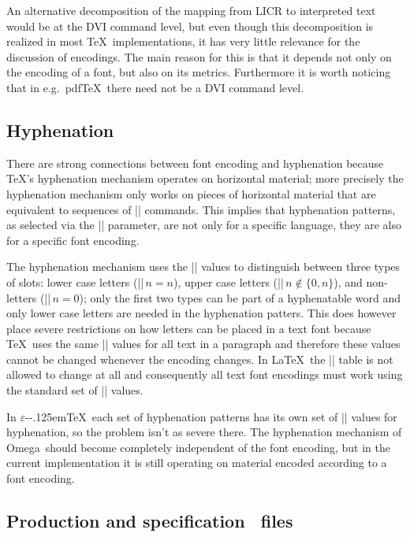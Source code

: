\documentclass[a4paper]{article}
\DeclareRobustCommand\ETX{\textsmaller{ETX}}
\newcommand{\TeXOmega}{Omega}
\DeclareRobustCommand\eTeX{\ensuremath{\varepsilon}-\kern-.125em\TeX}
\begin{document}
An alternative decomposition of the mapping from LICR to interpreted 
text would be at the DVI command level, but even though this 
decomposition is realized in most \TeX\ implementations, it has very 
little relevance for the discussion of encodings. The main reason for 
this is that it depends not only on the encoding of a font, but 
also on its metrics. Furthermore it is worth noticing that in e.g.\ 
pdf\TeX\ there need not be a DVI command level.


\subsection{Hyphenation}

There are strong connections between font encoding and hyphenation because 
\TeX's hyphenation mechanism operates on horizontal material; more 
precisely the hyphenation mechanism only works on pieces of horizontal 
material that are equivalent to sequences of |\char| commands. This 
implies that hyphenation patterns, as selected via the |\language| 
parameter, are not only for a specific language, they are also for a 
specific font encoding.

The hyphenation mechanism uses the |\lccode| values to distinguish 
between three types of slots: lower case letters (|\lccode|\(\,n = 
n\)), upper case letters (|\lccode|\(\,n \notin \{0,n\}\)), and 
non-letters (|\lccode|\(\,n = 0\)); only the first two types can be 
part of a hyphenatable word and only lower case letters are needed 
in the hyphenation patters. This does however place severe 
restrictions on how letters can be placed in a text font because 
\TeX\ uses the same |\lccode| values for all text in a paragraph and 
therefore these values cannot be changed whenever the encoding changes. 
In \LaTeX\ the |\lccode| table is not allowed to change at all and 
consequently all text font encodings must work using the standard set 
of |\lccode| values.

In \eTeX\ each set of hyphenation patterns has its own set of 
|\lccode| values for hyphenation, so the problem isn't as severe 
there. The hyphenation mechanism of \TeXOmega\ should become 
completely independent of the font encoding, but in the current 
implementation it is still operating on material encoded according to 
a font encoding.


\subsection{Production and specification \ETX\ files}
\end{document}
